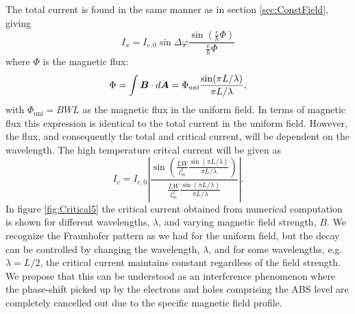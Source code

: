 \\
\\
The total current is found in the same manner as in section  \ref{sec:ConstField}, giving
\begin{equation}
I_x = 
I_{c,0}\sin\Delta\varphi\frac{\sin(\frac{e}{\hbar}\Phi)}{\frac{e}{\hbar}\Phi}
\end{equation}
where $\Phi$ is the magnetic flux:
\begin{equation}
    \Phi = \int \boldsymbol{B}\cdot d\boldsymbol{A} = 
    \Phi_{\mathrm{uni}}\frac{\sin(\pi L/\lambda)}{\pi L/\lambda},
\end{equation}
with $\Phi_{\mathrm{uni}} = BWL$ as the magnetic flux in the uniform field. In terms of magnetic flux this expression is identical to the total current in the uniform field. However, the flux, and consequently the total and critical current, will be dependent on the wavelength. The high temperature critcal current will be given as 
\begin{equation}
    I_c = I_{c,0}\left|\frac{\sin\left(\frac{LW}{l_m^2}\frac{\sin(\pi L/\lambda)}{\pi L/\lambda}\right)}{\frac{LW}{l_m^2}\frac{\sin(\pi L/\lambda)}{\pi L/\lambda}}\right|.
\end{equation}
In figure \ref{fig:Critical5} the critical current obtained from numerical computation is shown for different wavelengths, $\lambda$, and varying magnetic field strength, $B$. We recognize the Fraunhofer pattern as we had for the uniform field, but the decay can be controlled by changing the wavelength, $\lambda$, and for some wavelengths, e.g. $\lambda = L/2$, the critical current maintains constant regardless of the field strength. We propose that this can be understood as an interference phenomenon where the phase-shift picked up by the electrons and holes comprising the ABS level are completely cancelled out due to the specific magnetic field profile.
